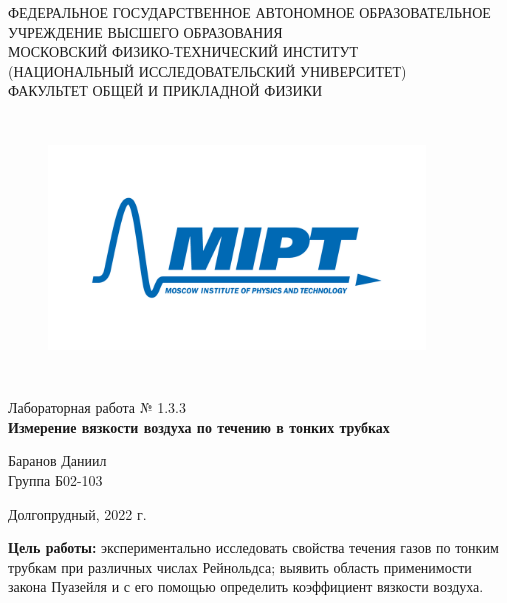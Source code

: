 \documentclass[a4paper,12pt]{article} %
\begin{document}
\begin{center}
	\footnotesize{ФЕДЕРАЛЬНОЕ ГОСУДАРСТВЕННОЕ АВТОНОМНОЕ ОБРАЗОВАТЕЛЬНОЕ 			УЧРЕЖДЕНИЕ ВЫСШЕГО ОБРАЗОВАНИЯ}\\
	\footnotesize{МОСКОВСКИЙ ФИЗИКО-ТЕХНИЧЕСКИЙ ИНСТИТУТ\\(НАЦИОНАЛЬНЫЙ 			ИССЛЕДОВАТЕЛЬСКИЙ УНИВЕРСИТЕТ)}\\
	\footnotesize{ФАКУЛЬТЕТ ОБЩЕЙ И ПРИКЛАДНОЙ ФИЗИКИ\\}
	\hfill \break
	\hfill \break
	\hfill \break
	\hfill \break
\end{center}


\begin{figure}[h]
    \centering
    \includegraphics*[width=10cm,height=7cm,keepaspectratio]{mipt_eng_text_png.png}
    \label{fig:my_label}
\end{figure}


\begin{center}   
    \hfill \break
	\hfill \break
	\hfill \break
	\hfill \break
	\large{Лабораторная работа № 1.3.3\\\textbf{Измерение вязкости воздуха по течению в тонких трубках}}\\
	\hfill \break
	\hfill \break
	\hfill \break
	\hfill \break
	\begin{flushright}
		Баранов Даниил\\
		Группа Б02-103
	\end{flushright}
	\hfill \break
	\hfill \break
	\hfill \break
\end{center}
\hfill \break
\hfill \break
\hfill \break
\hfill \break
\begin{center}
	Долгопрудный, 2022 г.
\end{center}
\thispagestyle{empty}



\newpage
\textbf{Цель работы:} экспериментально исследовать свойства течения газов по тонким трубкам при различных числах Рейнольдса; выявить область применимости закона Пуазейля и с его помощью определить коэффициент вязкости воздуха.\hfill
\break
	
\end{document}
